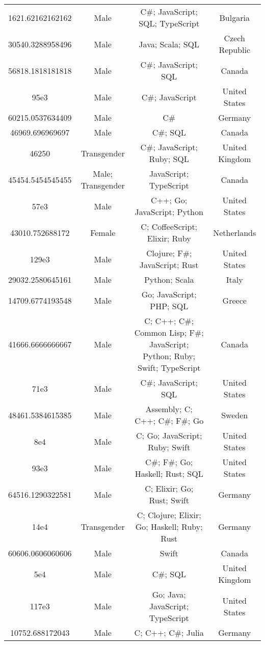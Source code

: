 \begin{center}
\begin{tabular}{ |c|c|c|c| }
1621.62162162162  &  Male  &  C\#; JavaScript; SQL; TypeScript  &  Bulgaria  \\ 
30540.3288958496  &  Male  &  Java; Scala; SQL  &  Czech Republic  \\ 
56818.1818181818  &  Male  &  C\#; JavaScript; SQL  &  Canada  \\ 
95e3  &  Male  &  C\#; JavaScript  &  United States  \\ 
60215.0537634409  &  Male  &  C\#  &  Germany  \\ 
46969.696969697  &  Male  &  C\#; SQL  &  Canada  \\ 
46250  &  Transgender  &  C\#; JavaScript; Ruby; SQL  &  United Kingdom  \\ 
45454.5454545455  &  Male; Transgender  &  JavaScript; TypeScript  &  Canada  \\ 
57e3  &  Male  &  C++; Go; JavaScript; Python  &  United States  \\ 
43010.752688172  &  Female  &  C; CoffeeScript; Elixir; Ruby  &  Netherlands  \\ 
129e3  &  Male  &  Clojure; F\#; JavaScript; Rust  &  United States  \\ 
29032.2580645161  &  Male  &  Python; Scala  &  Italy  \\ 
14709.6774193548  &  Male  &  Go; JavaScript; PHP; SQL  &  Greece  \\ 
41666.6666666667  &  Male  &  C; C++; C\#; Common Lisp; F\#; JavaScript; Python; Ruby; Swift; TypeScript  &  Canada  \\ 
71e3  &  Male  &  C\#; JavaScript; SQL  &  United States  \\ 
48461.5384615385  &  Male  &  Assembly; C; C++; C\#; F\#; Go  &  Sweden  \\ 
8e4  &  Male  &  C; Go; JavaScript; Ruby; Swift  &  United States  \\ 
93e3  &  Male  &  C\#; F\#; Go; Haskell; Rust; SQL  &  United States  \\ 
64516.1290322581  &  Male  &  C; Elixir; Go; Rust; Swift  &  Germany  \\ 
14e4  &  Transgender  &  C; Clojure; Elixir; Go; Haskell; Ruby; Rust  &  Germany  \\ 
60606.0606060606  &  Male  &  Swift  &  Canada  \\ 
5e4  &  Male  &  C\#; SQL  &  United Kingdom  \\ 
117e3  &  Male  &  Go; Java; JavaScript; TypeScript  &  United States  \\ 
10752.688172043  &  Male  &  C; C++; C\#; Julia  &  Germany  \\ 

\end{tabular}
\end{center}
